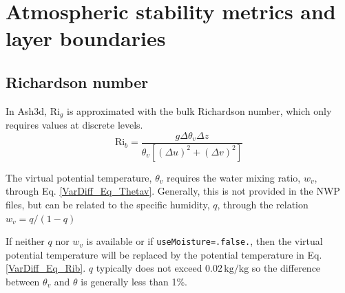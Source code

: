 %



\section{Atmospheric stability metrics and layer boundaries}
\subsection{Richardson number}

In Ash3d, $\mathrm{Ri}_g$ is approximated with the bulk Richardson number, which
only requires values at discrete levels.
\begin{equation}\label{VarDiff_Eq_Rib}
\mathrm{Ri}_b = \frac{g \Delta \theta_v \Delta z}
{\theta_v \left[ \left( \Delta u \right)^2 + \left( \Delta v \right)^2 \right]}
\end{equation}

The virtual potential temperature, $\theta_v$ requires the water mixing ratio, $w_v$,
through Eq. \ref{VarDiff_Eq_Thetav}. Generally, this is not provided
in the NWP files, but can be related to the specific humidity, $q$, through the relation
$w_v=q/(1-q)$

If neither $q$ nor $w_v$ is available or if \texttt{useMoisture=.false.}, then
the virtual potential temperature will be replaced by the potential temperature in Eq. \ref{VarDiff_Eq_Rib}.
$q$ typically does not exceed $0.02 \, \mathrm{kg}/\mathrm{kg}$ so the difference between $\theta_v$
and $\theta$ is generally less than 1\%.

